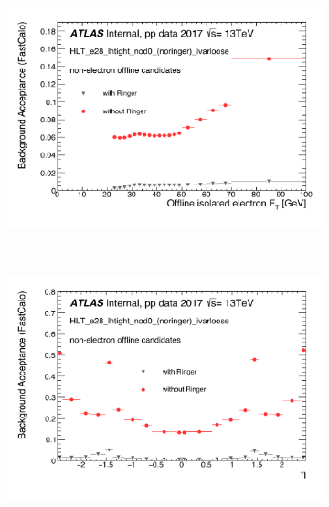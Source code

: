 \begin{figure}[h!tb]
  \begin{center}
  \begin{subfigure}[c]{.59\textwidth}
  \centering
  \includegraphics[width=\textwidth]{sections/04_operation/figures/efficiencies/eff_EGAM7_e28_ringer_and_noringer_2017_after_ts1_L2Calo_et.pdf}
  \caption{}
  \end{subfigure}\\
  \begin{subfigure}[c]{.59\textwidth}
  \centering
  \includegraphics[width=\textwidth]{sections/04_operation/figures/efficiencies/eff_EGAM7_e28_ringer_and_noringer_2017_after_ts1_L2Calo_eta.pdf}

\end{subfigure}
\end{center}
\end{figure}
